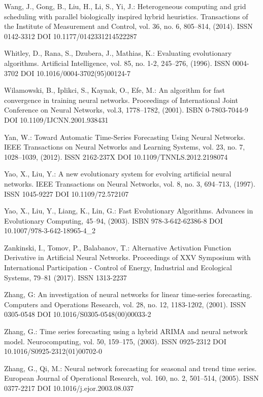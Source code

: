 \begin{thebibliography}{99.}
 Wang, J., Gong, B., Liu, H., Li, S., Yi, J.: Heterogeneous computing and grid scheduling with parallel biologically inspired hybrid heuristics. Transactions of the Institute of Measurement and Control, vol. 36, no. 6, 805--814, (2014). ISSN 0142-3312 DOI 10.1177/0142331214522287

 Whitley, D., Rana, S., Dzubera, J., Mathias, K.: Evaluating evolutionary algorithms. Artificial Intelligence, vol. 85, no. 1-2, 245--276, (1996). ISSN 0004-3702 DOI 10.1016/0004-3702(95)00124-7

 Wilamowski, B., Iplikci, S., Kaynak, O., Efe, M.: An algorithm for fast convergence in training neural networks. Proceedings of International Joint Conference on Neural Networks, vol.3, 1778--1782, (2001). ISBN 0-7803-7044-9 DOI 10.1109/IJCNN.2001.938431

 Yan, W.: Toward Automatic Time-Series Forecasting Using Neural Networks. IEEE Transactions on Neural Networks and Learning Systems, vol. 23, no. 7, 1028--1039, (2012). ISSN 2162-237X DOI 10.1109/TNNLS.2012.2198074

 Yao, X., Liu, Y.: A new evolutionary system for evolving artificial neural networks. IEEE Transactions on Neural Networks, vol. 8, no. 3, 694--713, (1997). ISSN 1045-9227 DOI 10.1109/72.572107

 Yao, X., Liu, Y., Liang, K., Lin, G.: Fast Evolutionary Algorithms. Advances in Evolutionary Computing, 45--94, (2003). ISBN 978-3-642-62386-8 DOI 10.1007/978-3-642-18965-4\_2

 Zankinski, I., Tomov, P., Balabanov, T.: Alternative Activation Function Derivative in Artificial Neural Networks. Proceedings of XXV Symposium with International Participation - Control of Energy, Industrial and Ecological Systems, 79--81 (2017). ISSN 1313-2237

 Zhang, G: An investigation of neural networks for linear time-series forecasting. Computers and Operations Research, vol. 28, no. 12, 1183-1202, (2001). ISSN 0305-0548 DOI 10.1016/S0305-0548(00)00033-2

 Zhang, G.: Time series forecasting using a hybrid ARIMA and neural network model. Neurocomputing, vol. 50, 159--175, (2003). ISSN 0925-2312 DOI 10.1016/S0925-2312(01)00702-0

 Zhang, G., Qi, M.: Neural network forecasting for seasonal and trend time series. European Journal of Operational Research, vol. 160, no. 2, 501--514, (2005). ISSN 0377-2217 DOI 10.1016/j.ejor.2003.08.037


\end{thebibliography}

